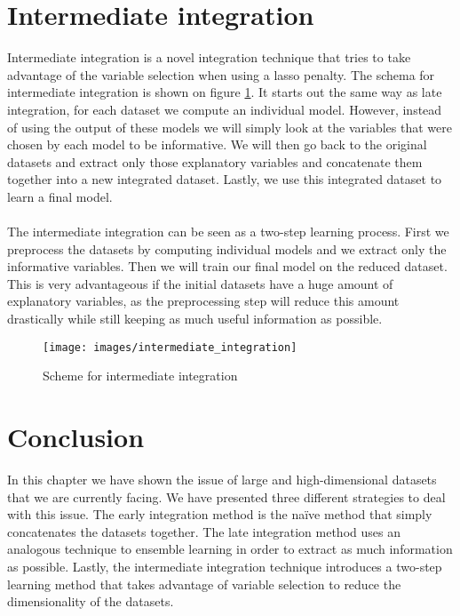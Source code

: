 \section{Intermediate integration}
\label{sec:integration-intermediate}
Intermediate integration is a novel integration technique that tries to take advantage of the variable selection when using a lasso penalty. The schema for intermediate integration is shown on figure \ref{fig:integration-intermediate}. It starts out the same way as late integration, for each dataset we compute an individual model. However, instead of using the output of these models we will simply look at the variables that were chosen by each model to be informative. We will then go back to the original datasets and extract only those explanatory variables and concatenate them together into a new integrated dataset. Lastly, we use this integrated dataset to learn a final model. \\ \\
The intermediate integration can be seen as a two-step learning process. First we preprocess the datasets by computing individual models and we extract only the informative variables. Then we will train our final model on the reduced dataset. This is very advantageous if the initial datasets have a huge amount of explanatory variables, as the preprocessing step will reduce this amount drastically while still keeping as much useful information as possible.
\begin{figure}
	\centering
	\texttt{[image: images/intermediate\_integration]}
	\caption{Scheme for intermediate integration}
	\label{fig:integration-intermediate}
\end{figure}
\section{Conclusion}
\label{sec:integration-conclusion}
In this chapter we have shown the issue of large and high-dimensional datasets that we are currently facing. We have presented three different strategies to deal with this issue. The early integration method is the na\"{i}ve method that simply concatenates the datasets together. The late integration method uses an analogous technique to ensemble learning in order to extract as much information as possible. Lastly, the intermediate integration technique introduces a two-step learning method that takes advantage of variable selection to reduce the dimensionality of the datasets.
